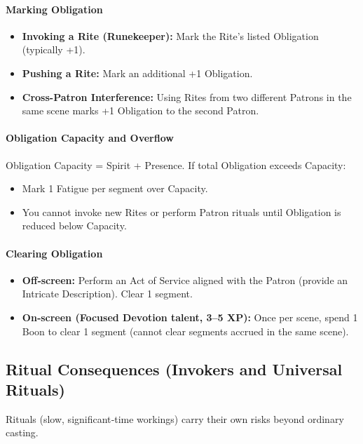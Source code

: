 \paragraph{Marking Obligation}
\begin{itemize}
  \item \textbf{Invoking a Rite (Runekeeper):} Mark the Rite's listed Obligation (typically +1).
  \item \textbf{Pushing a Rite:} Mark an additional +1 Obligation.
  \item \textbf{Cross-Patron Interference:} Using Rites from two different Patrons in the same scene marks +1 Obligation to the second Patron.
\end{itemize}

\paragraph{Obligation Capacity and Overflow}
Obligation Capacity = Spirit + Presence. If total Obligation exceeds Capacity:
\begin{itemize}
  \item Mark 1 Fatigue per segment over Capacity.
  \item You cannot invoke new Rites or perform Patron rituals until Obligation is reduced below Capacity.
\end{itemize}

\paragraph{Clearing Obligation}
\begin{itemize}
  \item \textbf{Off‑screen:} Perform an Act of Service aligned with the Patron (provide an Intricate Description). Clear 1 segment.
  \item \textbf{On‑screen (Focused Devotion talent, 3–5 XP):} Once per scene, spend 1 Boon to clear 1 segment (cannot clear segments accrued in the same scene).
\end{itemize}

\subsection{Ritual Consequences (Invokers and Universal Rituals)}
Rituals (slow, significant‑time workings) carry their own risks beyond ordinary casting.

